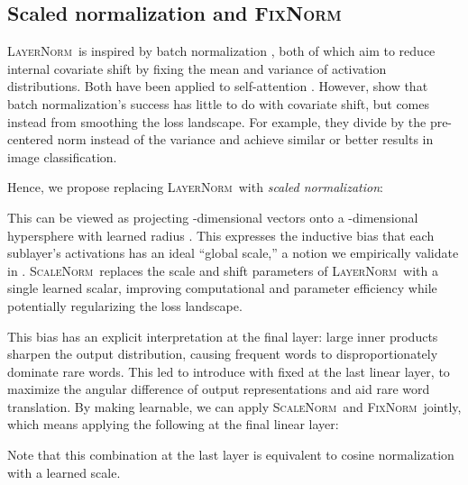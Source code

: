 \documentclass[11pt,a4paper]{article}
\newcommand{\keyword}[1]{\textit{#1}}
\newcommand{\LNorm}{\textsc{LayerNorm}}
\newcommand{\SCNorm}{\textsc{ScaleNorm}}
\newcommand{\fixnorm}{\textsc{FixNorm}}
\begin{document}
\subsection{Scaled  normalization and \fixnorm}
\label{ssec:scaled-cosine}

\LNorm\ is inspired by batch normalization \cite{Ioffe2015}, both of which aim to reduce internal covariate shift by fixing the mean and variance of activation distributions. Both have been applied to self-attention \cite{NIPS2017_7181,Kool2019}. However, \citet{Santurkar2018} show that batch normalization's success has little to do with covariate shift, but comes instead from smoothing the loss landscape. For example, they divide by the pre-centered  norm instead of the variance and achieve similar or better results in image classification.

Hence, we propose replacing \LNorm\ with \keyword{scaled  normalization}:

This can be viewed as projecting -dimensional vectors onto a -dimensional hypersphere with learned radius . This expresses the inductive bias that each sublayer's activations has an ideal ``global scale,'' a notion we empirically validate in . \SCNorm\ replaces the  scale and shift parameters of \LNorm\ with a single learned scalar, improving computational and parameter efficiency while potentially regularizing the loss landscape.

This bias has an explicit interpretation at the final layer: large inner products sharpen the output distribution, causing frequent words to disproportionately dominate rare words. This led \citet{Nguyen2018-improving-lexical-choice} to introduce  with fixed  at the last linear layer, to maximize the angular difference of output representations and aid rare word translation. By making  learnable, we can apply \SCNorm\ and \fixnorm\ jointly, which means applying the following at the final linear layer:

Note that this combination at the last layer is equivalent to cosine normalization \cite{Luo2017} with a learned scale.
\end{document}
